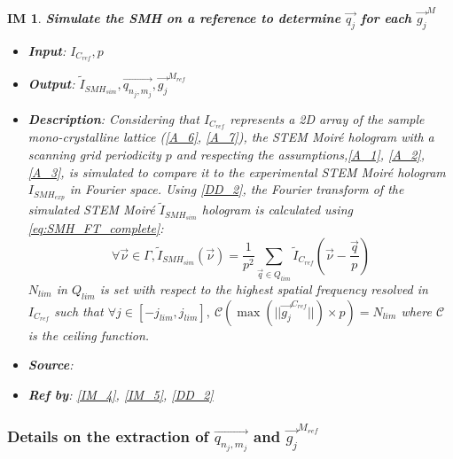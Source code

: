 \documentclass[12pt]{article}
\newtheorem{IM}{IM}
\begin{document}
\renewcommand{\labelitemi}{$-$}

\begin{IM}
\label{IM_1}
\noindent\colorbox{shadecolorIM}{\normalfont \textbf{Simulate the SMH on a reference to determine $\overrightarrow{q_{j}}$ for each $\overrightarrow{g_j}^{M}$}}
\normalfont
\begin{itemize}
\item \textbf{Input}: $I_{C_{ref}}, p$
\item \textbf{Output}: $\widetilde{I}_{SMH_{sim}}, \overrightarrow{q_{n_j,m_j}}, \overrightarrow{g_j}^{M_{ref}}$
\item \textbf{Description}: Considering that $I_{C_{ref}}$ represents a 2D array of the sample mono-crystalline lattice (\cref{A_6}, \cref{A_7}), the STEM Moir{\'e} hologram with a scanning grid periodicity $p$ and respecting the assumptions,\cref{A_1}, \cref{A_2}, \cref{A_3}, is simulated to compare it to the experimental STEM Moir{\'e} hologram $I_{SMH_{exp}}$ in Fourier space. Using \cref{DD_2}, the Fourier transform of the simulated STEM Moir{\'e} $\widetilde{I}_{SMH_{sim}}$ hologram is calculated using \cref{eq:SMH_FT_complete}:
\begin{equation}
\forall \vec{\nu} \in \Gamma, \widetilde{I}_{SMH_{sim}}(\vec{\nu})=\frac{1}{p^2}\sum_{\vec{q}\in Q_{lim}}\widetilde{I}_{C_{ref}}(\vec{\nu}-\frac{\vec{q}}{p})
\end{equation}
$N_{lim}$ in $Q_{lim}$ is set with respect to the highest spatial frequency resolved in  $I_{C_{ref}}$ such that $\forall j \in [-j_{lim},j_{lim}], \ \mathcal{C}(\max(||\overrightarrow{g_j}^{C_{ref}}||)\times p) = N_{lim}$ where $\mathcal{C}$ is the ceiling function.
\item \textbf{Source}: \cite{Pofelski2017}
\item \textbf{Ref by}: \cref{IM_4}, \cref{IM_5}, \cref{DD_2}
\end{itemize}
\end{IM}

\subsubsection*{Details on the extraction of $\overrightarrow{q_{n_j,m_j}}$ and $ \overrightarrow{g_j}^{M_{ref}}$}
\end{document}
